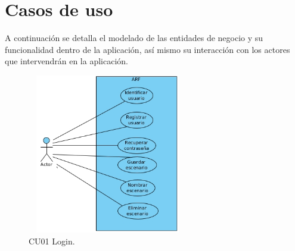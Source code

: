 \section{Casos de uso}
A continuación se detalla el modelado de las entidades de negocio y su funcionalidad dentro de la aplicación, así mismo su interacción con los actores que intervendrán en la aplicación.\par
\vspace{5mm} 	
\begin{figure}[h!]
	\centering
	\includegraphics[width=7cm,height=7cm]{imagenes/analisis/casosDeUso.jpg}
	\caption{CU01 Login.\cite{B27}}
	\label{fig:analogo}
\end{figure}  
\newpage

